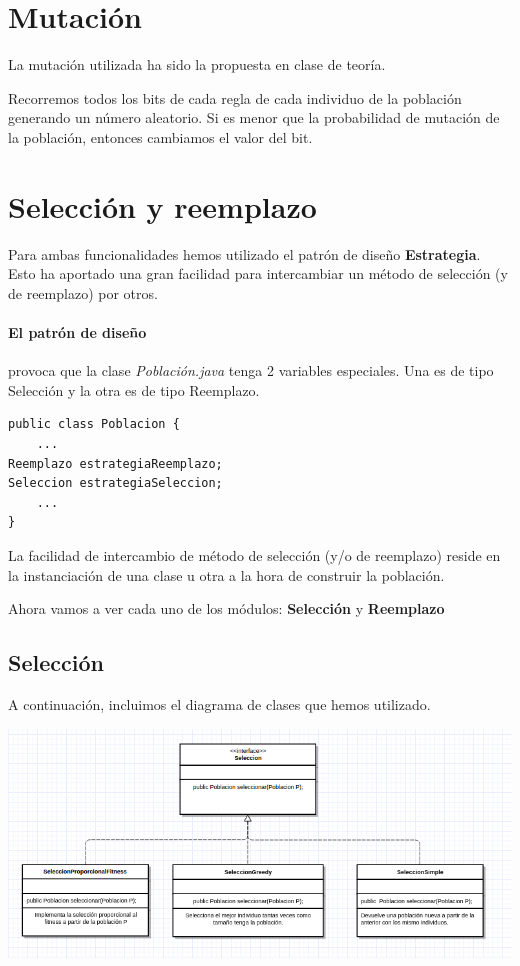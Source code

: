 \documentclass[nochap]{apuntes}
\begin{document}
\section{Mutación}
La mutación utilizada ha sido la propuesta en clase de teoría. 

Recorremos todos los bits de cada regla de cada individuo de la población generando un número aleatorio. Si es menor que la probabilidad de mutación de la población, entonces cambiamos el valor del bit.


\section{Selección y reemplazo}
Para ambas funcionalidades hemos utilizado el patrón de diseño \textbf{Estrategia}. Esto ha aportado una gran facilidad para intercambiar un método de selección (y de reemplazo) por otros.

\paragraph{El patrón de diseño} provoca que la clase \textit{Población.java} tenga 2 variables especiales. Una es de tipo Selección y la otra es de tipo Reemplazo. 

\begin{lstlisting}
public class Poblacion {
	...
Reemplazo estrategiaReemplazo;
Seleccion estrategiaSeleccion;
    ...
}
\end{lstlisting}

La facilidad de intercambio de método de selección (y/o de reemplazo) reside en la instanciación de una clase u otra a la hora de construir la población.

Ahora vamos a ver cada uno de los módulos: \textbf{Selección} y \textbf{Reemplazo}

\subsection{Selección}

A continuación, incluimos el diagrama de clases que hemos utilizado.

\begin{center}
\includegraphics[scale=0.5]{img/SeleccionUML.png}
\end{center}
\end{document}
